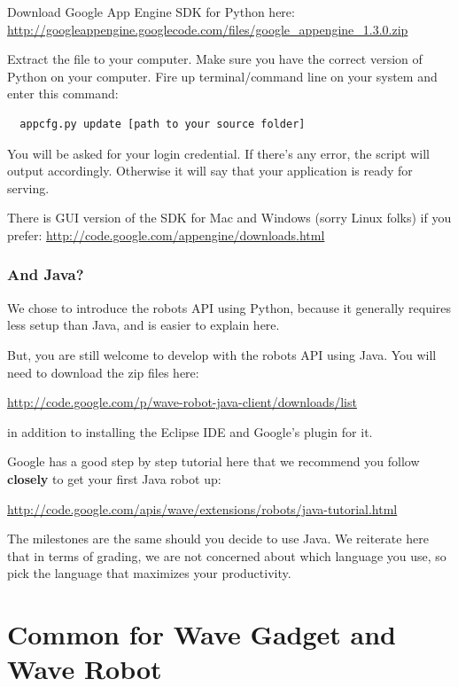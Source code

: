 Download Google App Engine SDK for Python
here: \url{http://googleappengine.googlecode.com/files/google_appengine_1.3.0.zip}

Extract the file to your computer. Make sure you have the correct
version of Python on your computer. Fire up terminal/command line on
your system and enter this command:

\begin{verbatim}
  appcfg.py update [path to your source folder]
\end{verbatim}

You will be asked for your login credential. If there's any error, the
script will output accordingly.  Otherwise it will say that your
application is ready for serving.

There is GUI version of the SDK for Mac and Windows (sorry Linux
 folks) if you
 prefer: \url{http://code.google.com/appengine/downloads.html}

\subsubsection{And Java?}

We chose to introduce the robots API using Python,
because it generally requires less setup than Java, and is easier to explain
here.

But, you are still welcome to develop with the robots API using Java.
You will need to download the zip files here:

\url{http://code.google.com/p/wave-robot-java-client/downloads/list}

in addition to installing the Eclipse IDE and Google's plugin for it.

Google has a good step by step tutorial here that we recommend you
follow \textbf{closely} to get your first Java robot up:

\url{http://code.google.com/apis/wave/extensions/robots/java-tutorial.html}

The milestones are the same should you decide to use Java. We
reiterate here that in terms of grading, we are not concerned about
which language you use, so pick the language that maximizes your
productivity.

\section{Common for Wave Gadget and Wave Robot}

